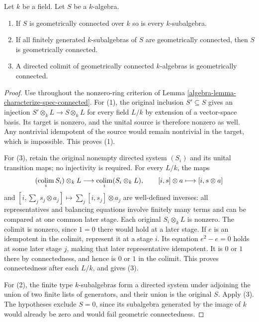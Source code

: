 \begin{lemma}
\label{editorial-source-lemma-subalgebra-geometrically-connected}
Let $k$ be a field. Let $S$ be a $k$-algebra.
\begin{enumerate}
\item If $S$ is geometrically connected over $k$ so is every
$k$-subalgebra.
\item If all finitely generated $k$-subalgebras of $S$ are
geometrically connected, then $S$ is geometrically connected.
\item A directed colimit of geometrically connected $k$-algebras
is geometrically connected.
\end{enumerate}
\end{lemma}

\begin{proof}
Use throughout the nonzero-ring
criterion of Lemma
\ref{algebra-lemma-characterize-spec-connected}.
For (1), the original inclusion
$S'\subseteq S$ gives an injection
$S'\otimes_k L\to S\otimes_k L$
for every field $L/k$ by extension
of a vector-space basis. Its
target is nonzero, and the
unital source is therefore
nonzero as well. Any nontrivial
idempotent of the source would
remain nontrivial in the target,
which is impossible. This proves (1).

For (3), retain the original
nonempty directed system $(S_i)$
and its unital transition maps;
no injectivity is required.
For every $L/k$, the maps
$$
(\mathop{\rm colim}_i S_i)\otimes_k L
\longrightarrow\mathop{\rm colim}_i(S_i\otimes_k L),
\qquad[i,s]\otimes a\longmapsto[i,s\otimes a]
$$
and $[i,\sum_j s_j\otimes a_j]\mapsto\sum_j[i,s_j]\otimes a_j$
are well-defined inverses:
all representatives and balancing
equations involve finitely many
terms and can be compared at
one common later stage.
Each original $S_i\otimes_k L$
is nonzero. The colimit is
nonzero, since $1=0$ there
would hold at a later stage.
If $e$ is an idempotent in
the colimit, represent it at
a stage $i$. Its equation
$e^2-e=0$ holds at some later
stage $j$, making that later
representative idempotent.
It is $0$ or $1$ there by
connectedness, and hence is
$0$ or $1$ in the colimit.
This proves connectedness after
each $L/k$, and gives (3).

For (2), the finite type
$k$-subalgebras form a directed
system under adjoining the union
of two finite lists of generators,
and their union is the original
$S$. Apply (3). The hypotheses
exclude $S=0$, since its
subalgebra generated by the
image of $k$ would already
be zero and would fail
geometric connectedness.


\end{proof}
